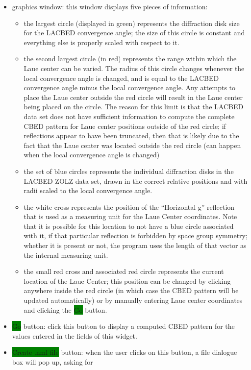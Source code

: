 \documentclass[DIV=calc, paper=letter, fontsize=11pt]{scrartcl}	 %
\newcommand{\button}[1]{\colorbox{green}{\textsf{#1}} button}
\begin{document}
\begin{itemize}
	\item \textsf{graphics window}: this window displays five pieces of information:
	\begin{itemize}
		\item the largest circle (displayed in green) represents the diffraction disk size for the LACBED convergence angle; the size of this circle is 
		constant and everything else is properly scaled with respect to it.
		\item the second largest circle (in red) represents the range within which the Laue center can be varied. The radius of this circle changes
		whenever the local convergence angle is changed, and is equal to the LACBED convergence angle minus the local convergence angle.  Any
		attempts to place the Laue center outside the red circle will result in the Laue center being placed on the circle.  The reason for
		this limit is that the LACBED data set does not have sufficient information to compute the complete CBED pattern for Laue center positions 
		outside of the red circle; if reflections appear to have been truncated, then that is likely due to the fact that the Laue center was
		located outside the red circle (can happen when the local convergence angle is changed)
		\item the set of blue circles represents the individual diffraction disks in the LACBED ZOLZ data set, drawn in the correct relative 
		positions and with radii scaled to the local convergence angle.
		\item the white cross represents the position of the ``Horizontal g'' reflection that is used as a measuring unit for the Laue Center 
		coordinates.  Note that it is possible for this location to not have a blue circle associated with it, if that particular reflection is 
		forbidden by space group symmetry; whether it is present or not, the program uses the length of that vector as the internal measuring unit.
		\item the small red cross and associated red circle represents the current location of the Laue Center;  this position can be changed by clicking anywhere 
		inside the red circle (in which case the CBED pattern will be updated automatically) or by manually entering Laue center coordinates
		and clicking the \button{Go}. 
	\end{itemize}
	\item \button{Go}: click this button to display a computed CBED pattern for the values entered in the fields of this widget.
	\item \button{Create .nml file}: when the user clicks on this button, a file dialogue box will pop up, asking for 

\end{itemize}
\end{document}
